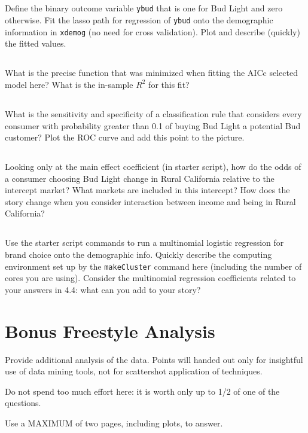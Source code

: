 \documentclass[12pt]{article}
\begin{document}
\subsection{}
Define the binary outcome variable {\tt ybud} that is one for Bud Light and zero otherwise.  Fit the lasso path for regression of {\tt ybud} onto the demographic information in {\tt xdemog}  (no need for cross validation). Plot and describe (quickly) the fitted values.

\subsection{} What is the precise function that was minimized when fitting the AICc selected model here?  What is the in-sample $R^2$ for this fit?

\subsection{} What is the sensitivity and specificity of a classification rule that considers every consumer with probability greater than 0.1 of buying Bud Light a potential Bud customer?  Plot the ROC curve and add this point to the picture.

\subsection{} Looking only at the main effect coefficient (in starter script), how do the odds of a consumer choosing Bud Light change in Rural California relative to the intercept market?   What markets are included in this intercept?  How does the story change when you consider interaction between income and being in Rural California? 

\subsection{} Use the starter script commands to run a multinomial logistic regression for brand choice onto the demographic info.  Quickly describe the computing environment set up by the {\tt makeCluster} command here (including the number of cores you are using).  Consider the multinomial regression coefficients related to your answers in 4.4: what can you add to your story?


\newpage
\section*{Bonus Freestyle Analysis}


Provide  additional analysis of the data.  Points will handed out only for insightful use of data mining tools, not for scattershot application of techniques.

\medskip \noindent
Do not spend too much effort here: it is worth only up to 1/2 of one of the questions.  

\medskip \noindent
{\sc Use a MAXIMUM of two pages, including plots, to answer.}
\end{document}

